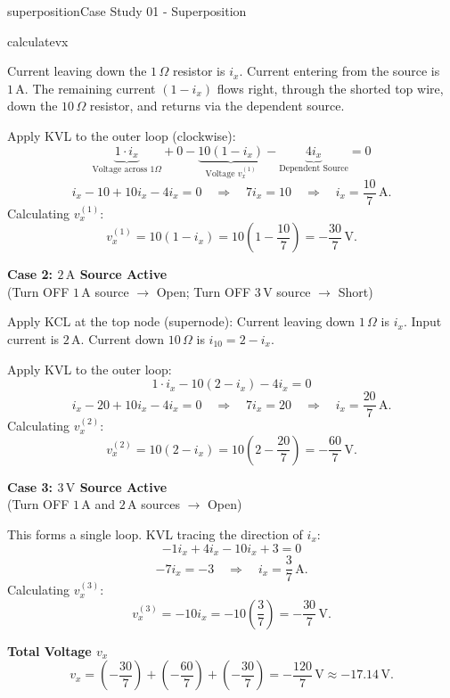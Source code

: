 \begin{mainquestion}{superposition}{Case Study 01 - Superposition}
\begin{partquestion}{calculatevx}
\begin{answer}[5 in]
        Current leaving down the $1\,\Omega$ resistor is $i_x$. Current entering from the source is $1\,\text{A}$. The remaining current $(1 - i_x)$ flows right, through the shorted top wire, down the $10\,\Omega$ resistor, and returns via the dependent source.
        
        Apply KVL to the outer loop (clockwise):
        \[
        \underbrace{1 \cdot i_x}_{\text{Voltage across } 1\Omega} + 0 - \underbrace{10(1-i_x)}_{\text{Voltage } v_x^{(1)}} - \underbrace{4i_x}_{\text{Dependent Source}} = 0
        \]
        \[
        i_x - 10 + 10i_x - 4i_x = 0 \quad \Rightarrow \quad 7i_x = 10 \quad \Rightarrow \quad i_x = \frac{10}{7}\,\text{A}.
        \]
        Calculating $v_x^{(1)}$:
        \[
        v_x^{(1)} = 10(1 - i_x) = 10\left(1 - \frac{10}{7}\right) = -\frac{30}{7}\,\text{V}.
        \]
        
        \medskip
        \textbf{Case 2: $2\,\text{A}$ Source Active} \\
        (Turn OFF $1\,\text{A}$ source $\to$ Open; Turn OFF $3\,\text{V}$ source $\to$ Short)
        
        Apply KCL at the top node (supernode): Current leaving down $1\,\Omega$ is $i_x$. Input current is $2\,\text{A}$. Current down $10\,\Omega$ is $i_{10} = 2 - i_x$.
        
        Apply KVL to the outer loop:
        \[
        1 \cdot i_x - 10(2 - i_x) - 4i_x = 0
        \]
        \[
        i_x - 20 + 10i_x - 4i_x = 0 \quad \Rightarrow \quad 7i_x = 20 \quad \Rightarrow \quad i_x = \frac{20}{7}\,\text{A}.
        \]
        Calculating $v_x^{(2)}$:
        \[
        v_x^{(2)} = 10(2 - i_x) = 10\left(2 - \frac{20}{7}\right) = -\frac{60}{7}\,\text{V}.
        \]
        
        \medskip
        \textbf{Case 3: $3\,\text{V}$ Source Active} \\
        (Turn OFF $1\,\text{A}$ and $2\,\text{A}$ sources $\to$ Open)
        
        This forms a single loop. KVL tracing the direction of $i_x$:
        \[
        -1i_x + 4i_x - 10i_x + 3 = 0
        \]
        \[
        -7i_x = -3 \quad \Rightarrow \quad i_x = \frac{3}{7}\,\text{A}.
        \]
        Calculating $v_x^{(3)}$:
        \[
        v_x^{(3)} = -10 i_x = -10\left(\frac{3}{7}\right) = -\frac{30}{7}\,\text{V}.
        \]
        
        \textbf{Total Voltage $v_x$}
        \[
        v_x = \left(-\frac{30}{7}\right) + \left(-\frac{60}{7}\right) + \left(-\frac{30}{7}\right) = -\frac{120}{7}\,\text{V} \approx -17.14\,\text{V}.
        \]
\end{answer}


\end{partquestion}
\end{mainquestion}
